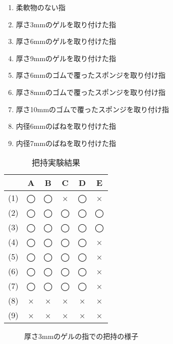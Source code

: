 \begin{enumerate}
  \item 柔軟物のない指
  \item 厚さ3mmのゲルを取り付けた指
  \item 厚さ6mmのゲルを取り付けた指
  \item 厚さ9mmのゲルを取り付けた指
  \item 厚さ6mmのゴムで覆ったスポンジを取り付け指
  \item 厚さ8mmのゴムで覆ったスポンジを取り付け指
  \item 厚さ10mmのゴムで覆ったスポンジを取り付け指
  \item 内径6mmのばねを取り付けた指
  \item 内径7mmのばねを取り付けた指
  
\end{enumerate}

\begin{table}[htbp]
    \caption{把持実験結果}
   \label{tab::result}
   \centering
   \begin{tabular}{|c||c|c|c|c|c|} \hline
          &A    &B     &C      &D     &E        \\ \hline \hline
        (1) & ◯ & ◯  & ×  & ◯ & ×  \\ \hline
        (2) & ◯ & ◯  & ◯  & ◯ & ◯  \\ \hline
        (3) & ◯ & ◯  & ◯  & ◯ & ◯  \\ \hline
		(4) & ◯ & ◯  & ◯  & ◯ & ×  \\ \hline
		(5) & ◯ & ◯  & ◯  & ◯ & ×  \\ \hline				
		(6) & ◯ & ◯  & ◯  & ◯ & ×  \\ \hline
		(7) & ◯ & ◯  & ◯  & ◯ & ×  \\ \hline
		(8) & × & ×  & ×  & × & ×  \\ \hline		
		(9) & × & ×  & ×  & × & ×  \\ \hline		
			
		
    \end{tabular}
\end{table}

\begin{figure}[h]
\centering
{}
\hspace{5mm}
\hspace{5mm}
\hspace{5mm}
\hspace{5mm}
\hspace{5mm}
\hspace{5mm}
\caption{厚さ3mmのゲルの指での把持の様子}
\label{fig::sisaku}
\end{figure}


